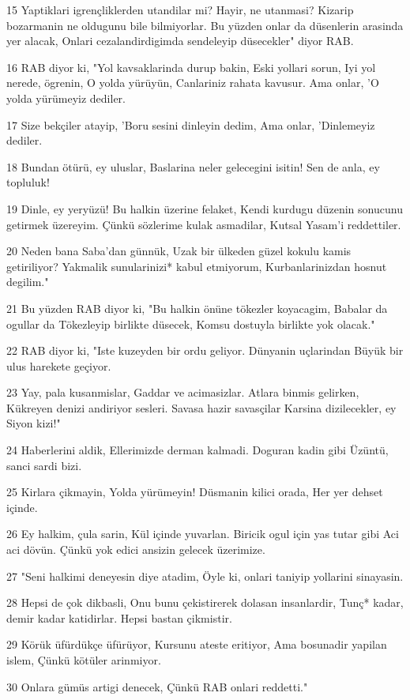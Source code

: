 \par 15 Yaptiklari igrençliklerden utandilar mi? Hayir, ne utanmasi? Kizarip bozarmanin ne oldugunu bile bilmiyorlar. Bu yüzden onlar da düsenlerin arasinda yer alacak, Onlari cezalandirdigimda sendeleyip düsecekler" diyor RAB.
\par 16 RAB diyor ki, "Yol kavsaklarinda durup bakin, Eski yollari sorun, Iyi yol nerede, ögrenin, O yolda yürüyün, Canlariniz rahata kavusur. Ama onlar, 'O yolda yürümeyiz dediler.
\par 17 Size bekçiler atayip, 'Boru sesini dinleyin dedim, Ama onlar, 'Dinlemeyiz dediler.
\par 18 Bundan ötürü, ey uluslar, Baslarina neler gelecegini isitin! Sen de anla, ey topluluk!
\par 19 Dinle, ey yeryüzü! Bu halkin üzerine felaket, Kendi kurdugu düzenin sonucunu getirmek üzereyim. Çünkü sözlerime kulak asmadilar, Kutsal Yasam'i reddettiler.
\par 20 Neden bana Saba'dan günnük, Uzak bir ülkeden güzel kokulu kamis getiriliyor? Yakmalik sunularinizi* kabul etmiyorum, Kurbanlarinizdan hosnut degilim."
\par 21 Bu yüzden RAB diyor ki, "Bu halkin önüne tökezler koyacagim, Babalar da ogullar da Tökezleyip birlikte düsecek, Komsu dostuyla birlikte yok olacak."
\par 22 RAB diyor ki, "Iste kuzeyden bir ordu geliyor. Dünyanin uçlarindan Büyük bir ulus harekete geçiyor.
\par 23 Yay, pala kusanmislar, Gaddar ve acimasizlar. Atlara binmis gelirken, Kükreyen denizi andiriyor sesleri. Savasa hazir savasçilar Karsina dizilecekler, ey Siyon kizi!"
\par 24 Haberlerini aldik, Ellerimizde derman kalmadi. Doguran kadin gibi Üzüntü, sanci sardi bizi.
\par 25 Kirlara çikmayin, Yolda yürümeyin! Düsmanin kilici orada, Her yer dehset içinde.
\par 26 Ey halkim, çula sarin, Kül içinde yuvarlan. Biricik ogul için yas tutar gibi Aci aci dövün. Çünkü yok edici ansizin gelecek üzerimize.
\par 27 "Seni halkimi deneyesin diye atadim, Öyle ki, onlari taniyip yollarini sinayasin.
\par 28 Hepsi de çok dikbasli, Onu bunu çekistirerek dolasan insanlardir, Tunç* kadar, demir kadar katidirlar. Hepsi bastan çikmistir.
\par 29 Körük üfürdükçe üfürüyor, Kursunu ateste eritiyor, Ama bosunadir yapilan islem, Çünkü kötüler arinmiyor.
\par 30 Onlara gümüs artigi denecek, Çünkü RAB onlari reddetti."

